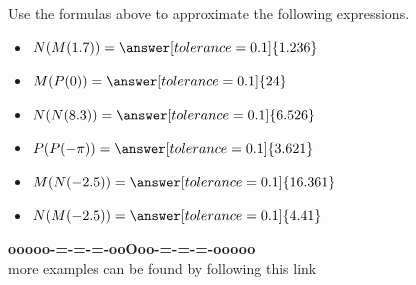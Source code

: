 \documentclass{ximera}
\begin{document}
\begin{question}


Use the formulas above to approximate the following expressions.



\begin{itemize}

\item $N(M(1.7)) = \answer[tolerance=0.1]{1.236}$ 

\item $M(P(0)) = \answer[tolerance=0.1]{24}$ 

\item $N(N(8.3)) = \answer[tolerance=0.1]{6.526}$ 

\item $P(P(-\pi)) = \answer[tolerance=0.1]{3.621}$ 

\item $M(N(-2.5)) = \answer[tolerance=0.1]{16.361}$ 

\item $N(M(-2.5)) = \answer[tolerance=0.1]{4.41}$ 

\end{itemize}



\end{question}




















\begin{center}
\textbf{\textcolor{green!50!black}{ooooo-=-=-=-ooOoo-=-=-=-ooooo}} \\

more examples can be found by following this link\\ 

\end{center}
\end{document}
